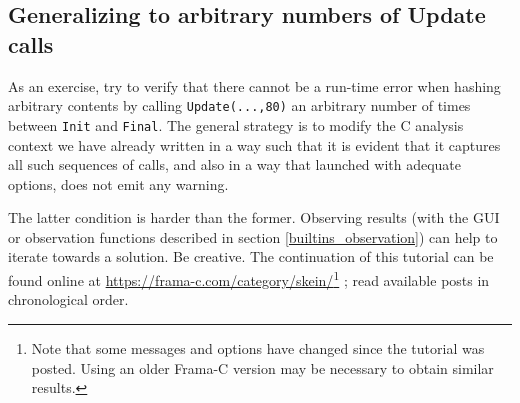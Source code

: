 \documentclass{frama-c-book}
\begin{document}
\subsection{Generalizing to arbitrary numbers of Update calls}

As an exercise, try to verify that there cannot be a run-time error
when hashing arbitrary contents by
calling \lstinline|Update(...,80)| an arbitrary number of times
between \lstinline|Init| and \lstinline|Final|.  The general strategy
is to modify the C analysis context we have already written in a way
such that it is evident that it captures all such sequences of calls,
and also in a way that launched with adequate options,
\Eva{} does not emit any warning.

The latter condition is harder than the former.
Observing results (with the GUI or observation functions
described in section \ref{builtins_observation}) can help to iterate towards
a solution. Be creative. The continuation of this tutorial can be found online
at \url{https://frama-c.com/category/skein/}\footnote{Note that some
  messages and options have changed since the tutorial was posted. Using an
  older Frama-C version may be necessary to obtain similar results.}
; read available posts in chronological order.


\end{document}
